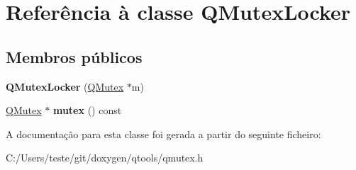 \hypertarget{class_q_mutex_locker}{\section{Referência à classe Q\-Mutex\-Locker}
\label{class_q_mutex_locker}
}
\subsection*{Membros públicos}
\begin{DoxyCompactItemize}
\item 
\hypertarget{class_q_mutex_locker_a1d9500a918dfb605cd1478d4d337e2f2}{{\bfseries Q\-Mutex\-Locker} (\hyperlink{class_q_mutex}{Q\-Mutex} $\ast$m)}\label{class_q_mutex_locker_a1d9500a918dfb605cd1478d4d337e2f2}

\item 
\hypertarget{class_q_mutex_locker_a12654db956b219a861073d19d24f1f55}{\hyperlink{class_q_mutex}{Q\-Mutex} $\ast$ {\bfseries mutex} () const }\label{class_q_mutex_locker_a12654db956b219a861073d19d24f1f55}

\end{DoxyCompactItemize}


A documentação para esta classe foi gerada a partir do seguinte ficheiro\-:\begin{DoxyCompactItemize}
\item 
C\-:/\-Users/teste/git/doxygen/qtools/qmutex.\-h\end{DoxyCompactItemize}
